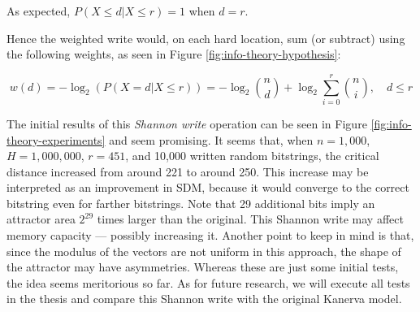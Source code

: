 As expected, $P(X \leq d | X \leq r) = 1$ when $d = r$.

Hence the weighted write would, on each hard location, sum (or subtract) using the following weights, as seen in Figure \ref{fig:info-theory-hypothesis}:

$$
w(d) = -\log_2 \left( P(X = d | X \leq r) \right) = - \log_2 \binom{n}{d} + \log_2 \sum_{i=0}^{r} \binom{n}{i}, \quad d \leq r
$$



The initial results of this \emph{Shannon write} operation can be seen in Figure \ref{fig:info-theory-experiments} and seem promising. It seems that, when $n=1,000$, $H=1,000,000$, $r=451$, and 10,000 written random bitstrings, the critical distance increased from around 221 to around 250. This increase may be interpreted as an improvement in SDM, because it would converge to the correct bitstring even for farther bitstrings. Note that 29 additional bits imply an attractor area $2^{29}$ times larger than the original. This Shannon write may affect memory capacity \citep{chou_capacity_1989, chou_capacity_1988, sjodin_improving_1995} --- possibly increasing it. Another point to keep in mind is that, since the modulus of the vectors are not uniform in this approach, the shape of the attractor may have asymmetries. Whereas these are just some initial tests, the idea seems meritorious so far.  As for future research, we will execute all tests in the thesis and compare this Shannon write with the original Kanerva model.













